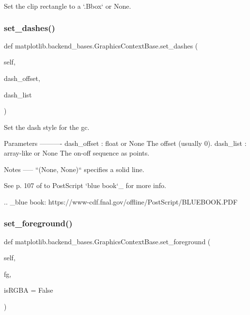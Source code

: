 \begin{DoxyVerb}Set the clip rectangle to a `.Bbox` or None.\end{DoxyVerb}
 \mbox{\label{classmatplotlib_1_1backend__bases_1_1GraphicsContextBase_a39cd59c5f7f6c3d04fccb2b00af44a96}} 
\subsubsection{\texorpdfstring{set\+\_\+dashes()}{set\_dashes()}}
{\footnotesize\ttfamily def matplotlib.\+backend\+\_\+bases.\+Graphics\+Context\+Base.\+set\+\_\+dashes (\begin{DoxyParamCaption}\item[{}]{self,  }\item[{}]{dash\+\_\+offset,  }\item[{}]{dash\+\_\+list }\end{DoxyParamCaption})}

\begin{DoxyVerb}Set the dash style for the gc.

Parameters
----------
dash_offset : float or None
    The offset (usually 0).
dash_list : array-like or None
    The on-off sequence as points.

Notes
-----
``(None, None)`` specifies a solid line.

See p. 107 of to PostScript `blue book`_ for more info.

.. _blue book: https://www-cdf.fnal.gov/offline/PostScript/BLUEBOOK.PDF
\end{DoxyVerb}
 \mbox{\label{classmatplotlib_1_1backend__bases_1_1GraphicsContextBase_a5f439cffb7b5b063102decf539930483}} 
\subsubsection{\texorpdfstring{set\+\_\+foreground()}{set\_foreground()}}
{\footnotesize\ttfamily def matplotlib.\+backend\+\_\+bases.\+Graphics\+Context\+Base.\+set\+\_\+foreground (\begin{DoxyParamCaption}\item[{}]{self,  }\item[{}]{fg,  }\item[{}]{is\+R\+G\+BA = {\ttfamily False} }\end{DoxyParamCaption})}

